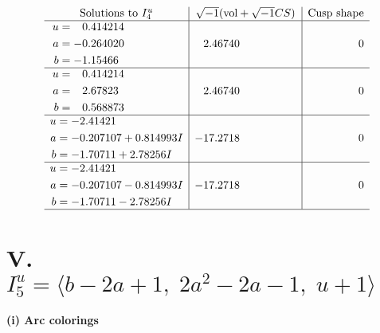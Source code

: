 \documentclass[1p]{elsarticle_modified}
\theoremstyle{definition}
\newcommand{\I}{\sqrt{-1}}
\begin{document}
$$\begin{array}{c|c|c}  
\text{Solutions to }I^u_{4}& \I (\text{vol} + \sqrt{-1}CS) & \text{Cusp shape}\\
 \hline 
\begin{aligned}
u &= \phantom{-}0.414214\phantom{ +0.000000I} \\
a &= -0.264020\phantom{ +0.000000I} \\
b &= -1.15466\phantom{ +0.000000I}\end{aligned}
 & \phantom{-}2.46740\phantom{ +0.000000I} & \phantom{-0.000000 } 0 \\ \hline\begin{aligned}
u &= \phantom{-}0.414214\phantom{ +0.000000I} \\
a &= \phantom{-}2.67823\phantom{ +0.000000I} \\
b &= \phantom{-}0.568873\phantom{ +0.000000I}\end{aligned}
 & \phantom{-}2.46740\phantom{ +0.000000I} & \phantom{-0.000000 } 0 \\ \hline\begin{aligned}
u &= -2.41421\phantom{ +0.000000I} \\
a &= -0.207107 + 0.814993 I \\
b &= -1.70711 + 2.78256 I\end{aligned}
 & -17.2718\phantom{ +0.000000I} & \phantom{-0.000000 } 0 \\ \hline\begin{aligned}
u &= -2.41421\phantom{ +0.000000I} \\
a &= -0.207107 - 0.814993 I \\
b &= -1.70711 - 2.78256 I\end{aligned}
 & -17.2718\phantom{ +0.000000I} & \phantom{-0.000000 } 0\\
 \hline 
 \end{array}$$\newpage\newpage\renewcommand{\arraystretch}{1}
\centering \section*{V. $I^u_{5}= \langle b-2 a+1,\;2 a^2-2 a-1,\;u+1 \rangle$}
\flushleft \textbf{(i) Arc colorings}\\
\end{document}

